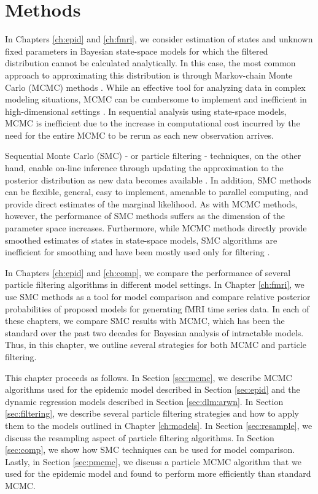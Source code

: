 \chapter{Methods \label{ch:meth}}

In Chapters \ref{ch:epid} and \ref{ch:fmri}, we consider estimation of states and unknown fixed parameters in Bayesian state-space models for which the filtered distribution cannot be calculated analytically. In this case, the most common approach to approximating this distribution is through Markov-chain Monte Carlo (MCMC) methods \citep{Gelf:Smit:samp:1990}. While an effective tool for analyzing data in complex modeling situations, MCMC can be cumbersome to implement and inefficient in high-dimensional settings \cite[Chapter 8][]{Robe:Case:mont:2004}. In sequential analysis using state-space models, MCMC is inefficient due to the increase in computational cost incurred by the need for the entire MCMC to be rerun as each new observation arrives.

Sequential Monte Carlo (SMC) - or particle filtering - techniques, on the other hand, enable on-line inference through updating the approximation to the posterior distribution as new data becomes available \citep{Douc:deFr:Gord:sequ:2001, cappe2007overview}. In addition, SMC methods can be flexible, general, easy to implement, amenable to parallel computing, and provide direct estimates of the marginal likelihood. As with MCMC methods, however, the performance of SMC methods suffers as the dimension of the parameter space increases. Furthermore, while MCMC methods directly provide smoothed estimates of states in state-space models, SMC algorithms are inefficient for smoothing and have been mostly used only for filtering \cite[Section 5][]{douc:joh:tut:2009}.

In Chapters \ref{ch:epid} and \ref{ch:comp}, we compare the performance of several particle filtering algorithms in different model settings. In Chapter \ref{ch:fmri}, we use SMC methods as a tool for model comparison and compare relative posterior probabilities of proposed models for generating fMRI time series data. In each of these chapters, we compare SMC results with MCMC, which has been the standard over the past two decades for Bayesian analysis of intractable models. Thus, in this chapter, we outline several strategies for both MCMC and particle filtering.

This chapter proceeds as follows. In Section \ref{sec:mcmc}, we describe MCMC algorithms used for the epidemic model described in Section \ref{sec:epid} and the dynamic regression models described in Section \ref{sec:dlm:arwn}. In Section \ref{sec:filtering}, we describe several particle filtering strategies and how to apply them to the models outlined in Chapter \ref{ch:models}. In Section \ref{sec:resample}, we discuss the resampling aspect of particle filtering algorithms. In Section \ref{sec:comp}, we show how SMC techniques can be used for model comparison. Lastly, in Section \ref{sec:pmcmc}, we discuss a particle MCMC algorithm that we used for the epidemic model and found to perform more efficiently than standard MCMC.

